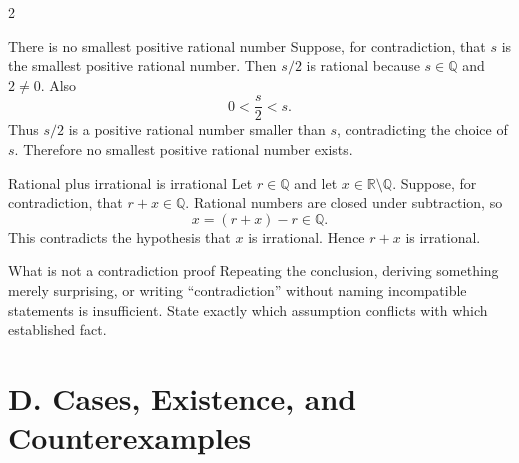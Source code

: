 \documentclass[10pt]{article}
\newcommand{\Q}{\mathbb Q}
\newcommand{\R}{\mathbb R}
\begin{document}
\begin{multicols}{2}
\begin{workedbox}{There is no smallest positive rational number}
Suppose, for contradiction, that $s$ is the smallest positive rational number.
Then $s/2$ is rational because $s\in\Q$ and $2\ne0$. Also
\[
 0<\frac{s}{2}<s.
\]
Thus $s/2$ is a positive rational number smaller than $s$, contradicting the
choice of $s$. Therefore no smallest positive rational number exists.
\end{workedbox}

\begin{workedbox}{Rational plus irrational is irrational}
Let $r\in\Q$ and let $x\in\R\setminus\Q$. Suppose, for contradiction, that
$r+x\in\Q$. Rational numbers are closed under subtraction, so
\[
 x=(r+x)-r\in\Q.
\]
This contradicts the hypothesis that $x$ is irrational. Hence $r+x$ is
irrational.
\end{workedbox}

\begin{warningbox}{What is not a contradiction proof}
Repeating the conclusion, deriving something merely surprising, or writing
``contradiction'' without naming incompatible statements is insufficient.
State exactly which assumption conflicts with which established fact.
\end{warningbox}
\end{multicols}

\clearpage
\section*{D. Cases, Existence, and Counterexamples}
\end{document}
